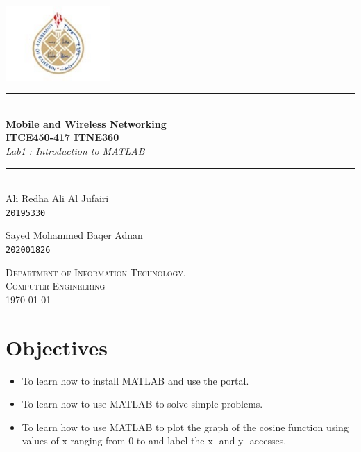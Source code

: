 \documentclass[12pt,a4paper]{article}
\newcommand{\HRule}{\rule{\linewidth}{0.5mm}}
\begin{document}
\begin{titlepage}
\begin{center}

\includegraphics[width=0.3\textwidth]{images/Picture2.jpg}~\\[2cm]


\HRule \\[0.4cm]
{ \LARGE 
  \textbf{Mobile and Wireless Networking }\\[0.4cm] 
  \textbf{ITCE450-417 ITNE360}\\[0.4cm]
  \emph{Lab1 : Introduction to MATLAB}\\[0.4cm]
}
\HRule \\[1.5cm]



{ \large
  Ali Redha Ali Al Jufairi \\[0.1cm]
  \texttt{20195330}
}

{ \large
  Sayed Mohammed Baqer Adnan\\[0.1cm]
  \texttt{202001826}
}
\vfill

\textsc{\large Department of Information Technology,\\Computer Engineering }\\[0.4cm]


{\large \today}
 
\end{center}
\end{titlepage}


\newpage



\section{Objectives}
\begin{itemize}
\item To learn how to install  MATLAB and use the portal.
\item To learn how to use MATLAB to solve simple problems.
\item  To learn how to use MATLAB to plot the graph of the cosine function using values of x ranging from 0 to and label the x- and y- accesses.
\end{itemize}
\end{document}

